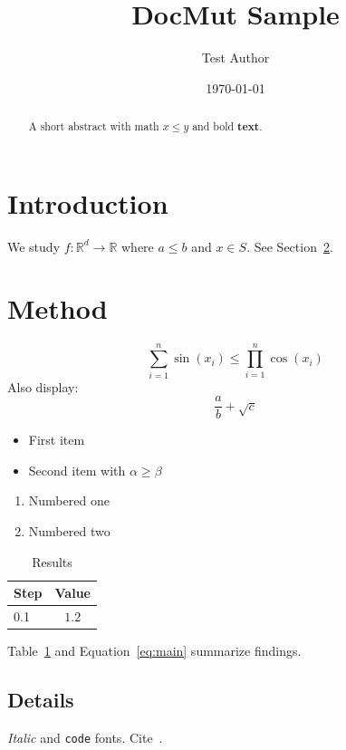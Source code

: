 \documentclass[11pt]{article}
\title{DocMut Sample}
\author{Test Author}
\date{\today}
\begin{document}
\maketitle

\begin{abstract}
A short abstract with math $x \leq y$ and bold \textbf{text}.
\end{abstract}

\section{Introduction}\label{sec:intro}
We study $f:\mathbb{R}^d \to \mathbb{R}$ where $a \leq b$ and $x \in S$.
See Section~\ref{sec:method}.

\section{Method}\label{sec:method}
\begin{equation}\label{eq:main}
  \sum_{i=1}^{n} \sin(x_i) \leq \prod_{i=1}^{n} \cos(x_i)
\end{equation}
Also display:
\[
  \frac{a}{b} + \sqrt{c}
\]

\begin{itemize}
  \item First item
  \item Second item with $\alpha \geq \beta$
\end{itemize}

\begin{enumerate}
  \item Numbered one
  \item Numbered two
\end{enumerate}

\begin{table}[h]
\centering
\caption{Results}
\label{tab:res}
\begin{tabular}{lc}
\toprule
Step & Value \\
\midrule
0.1 & $1.2$ \\
\bottomrule
\end{tabular}
\end{table}

Table~\ref{tab:res} and Equation~\eqref{eq:main} summarize findings.

\subsection{Details}\label{sec:details}
\textit{Italic} and \texttt{code} fonts. Cite~\cite{fake2020}.
\end{document}
